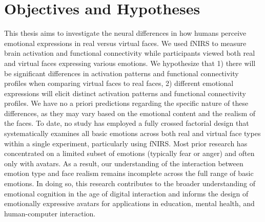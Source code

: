 \section{Objectives and Hypotheses}
This thesis aims to investigate the neural differences in how humans perceive emotional expressions in real versus virtual faces. 
We used fNIRS to measure brain activation and functional connectivity while participants viewed both real and virtual faces expressing various emotions.
We hypothesize that 1) there will be significant differences in activation patterns and functional connectivity profiles when comparing virtual faces to real faces, 
2) different emotional expressions will elicit distinct activation patterns and functional connectivity profiles. 
We have no a priori predictions regarding the specific nature of these differences, as they may vary based on the emotional content and the realism of the faces.
To date, no study has employed a fully crossed factorial design that systematically examines all basic emotions across both real and virtual face types within a single experiment, particularly using fNIRS. 
Most prior research has concentrated on a limited subset of emotions (typically fear or anger) and often only with avatars. 
As a result, our understanding of the interaction between emotion type and face realism remains incomplete across the full range of basic emotions.
In doing so, this research contributes to the broader understanding of emotional cognition in the age of digital interaction and informs the design of emotionally expressive avatars for applications in education, mental health, and human-computer interaction.

